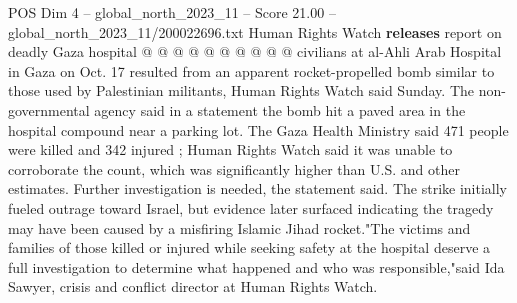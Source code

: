 \begin{textsample}{POS Dim 4 – global\_north\_2023\_11 – Score 21.00 – global\_north\_2023\_11/200022696.txt}
Human Rights Watch \textbf{releases} report on deadly Gaza hospital @ @ @ @ @ @ @ @ @ @ civilians at al-Ahli Arab Hospital in Gaza on Oct. 17 resulted from an apparent rocket-propelled bomb similar to those used by Palestinian militants, Human Rights Watch said Sunday.
The non-governmental agency said in a statement the bomb hit a paved area in the hospital compound near a parking lot.
The Gaza Health Ministry said 471 people were killed and 342 injured ; Human Rights Watch said it was unable to corroborate the count, which was significantly higher than U.S. and other estimates.
Further investigation is needed, the statement said.
The strike initially fueled outrage toward Israel, but evidence later surfaced indicating the tragedy may have been caused by a misfiring Islamic Jihad rocket."The victims and families of those killed or injured while seeking safety at the hospital deserve a full investigation to determine what happened and who was responsible,"said Ida Sawyer, crisis and conflict director at Human Rights Watch.

\end{textsample}
